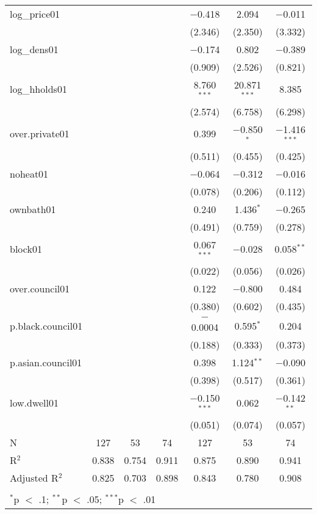\begin{table}[!htbp]
\begin{tabular}{@{\extracolsep{5pt}}lcccccc}
  log\_price01 &  &  &  & $-$0.418 & 2.094 & $-$0.011 \\ 
  &  &  &  & (2.346) & (2.350) & (3.332) \\ 
  log\_dens01 &  &  &  & $-$0.174 & 0.802 & $-$0.389 \\ 
  &  &  &  & (0.909) & (2.526) & (0.821) \\ 
  log\_hholds01 &  &  &  & 8.760$^{***}$ & 20.871$^{***}$ & 8.385 \\ 
  &  &  &  & (2.574) & (6.758) & (6.298) \\ 
  over.private01 &  &  &  & 0.399 & $-$0.850$^{*}$ & $-$1.416$^{***}$ \\ 
  &  &  &  & (0.511) & (0.455) & (0.425) \\ 
  noheat01 &  &  &  & $-$0.064 & $-$0.312 & $-$0.016 \\ 
  &  &  &  & (0.078) & (0.206) & (0.112) \\ 
  ownbath01 &  &  &  & 0.240 & 1.436$^{*}$ & $-$0.265 \\ 
  &  &  &  & (0.491) & (0.759) & (0.278) \\ 
  block01 &  &  &  & 0.067$^{***}$ & $-$0.028 & 0.058$^{**}$ \\ 
  &  &  &  & (0.022) & (0.056) & (0.026) \\ 
  over.council01 &  &  &  & 0.122 & $-$0.800 & 0.484 \\ 
  &  &  &  & (0.380) & (0.602) & (0.435) \\ 
  p.black.council01 &  &  &  & $-$0.0004 & 0.595$^{*}$ & 0.204 \\ 
  &  &  &  & (0.188) & (0.333) & (0.373) \\ 
  p.asian.council01 &  &  &  & 0.398 & 1.124$^{**}$ & $-$0.090 \\ 
  &  &  &  & (0.398) & (0.517) & (0.361) \\ 
  low.dwell01 &  &  &  & $-$0.150$^{***}$ & 0.062 & $-$0.142$^{**}$ \\ 
  &  &  &  & (0.051) & (0.074) & (0.057) \\ 
 N & 127 & 53 & 74 & 127 & 53 & 74 \\ 
R$^{2}$ & 0.838 & 0.754 & 0.911 & 0.875 & 0.890 & 0.941 \\ 
Adjusted R$^{2}$ & 0.825 & 0.703 & 0.898 & 0.843 & 0.780 & 0.908 \\ 
\hline \\[-1.8ex] 
\multicolumn{7}{l}{$^{*}$p $<$ .1; $^{**}$p $<$ .05; $^{***}$p $<$ .01} \\ 
\end{tabular} 
\end{table} 
